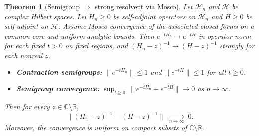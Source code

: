 \documentclass[11pt]{amsart}
\theoremstyle{plain}
\newtheorem{theorem}{Theorem}[section]
\theoremstyle{definition}
\theoremstyle{remark}
\begin{document}
\begin{theorem}[Semigroup $\Rightarrow$ strong resolvent via Mosco]\label{thm:NRC-allz}
Let $\mathcal{H}_n$ and $\mathcal{H}$ be complex Hilbert spaces. Let $H_n\ge 0$ be self-adjoint operators on $\mathcal{H}_n$ and $H\ge 0$ be self-adjoint on $\mathcal{H}$. Assume Mosco convergence of the associated closed forms on a common core and uniform analytic bounds. Then $e^{-tH_n}\to e^{-tH}$ in operator norm for each fixed $t>0$ on fixed regions, and $(H_n-z)^{-1}\to (H-z)^{-1}$ strongly for each nonreal $z$.
\begin{itemize}
  \item[(H1)] \textbf{Contraction semigroups:} $\|e^{-tH_n}\| \le 1$ and $\|e^{-tH}\| \le 1$ for all $t \ge 0$.
  \item[(H2)] \textbf{Semigroup convergence:} $\sup_{t\ge 0}\,\|e^{-tH_n}-e^{-tH}\|\to 0$ as $n\to\infty$.
\end{itemize}
Then for every $z\in\mathbb C\setminus\mathbb R$,
\[
  \|(H_n-z)^{-1}-(H-z)^{-1}\|\;\xrightarrow[n\to\infty]{}\;0.
\]
Moreover, the convergence is uniform on compact subsets of $\mathbb{C} \setminus \mathbb{R}$.
\end{theorem}
\end{document}
